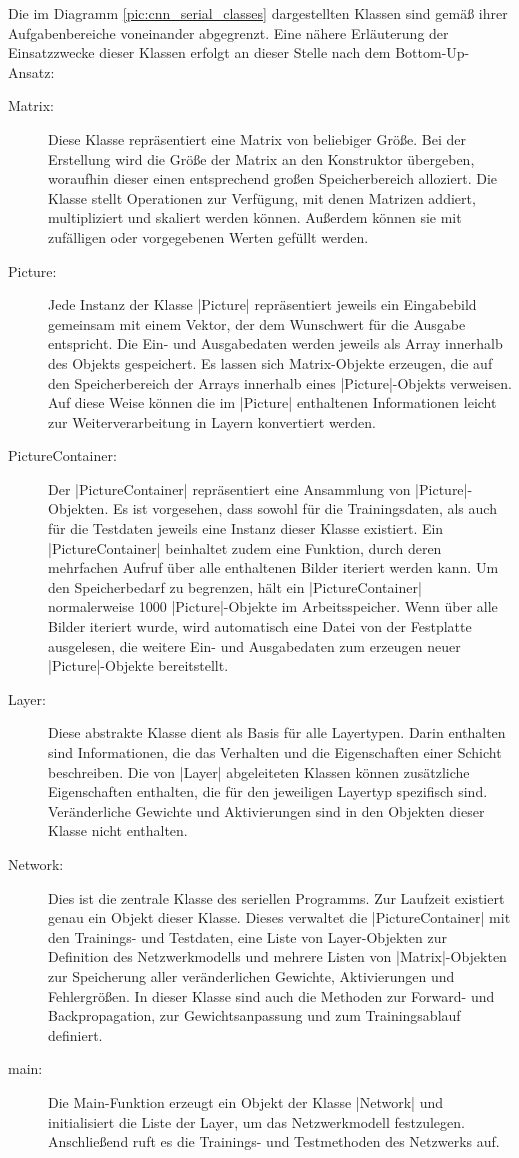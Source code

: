 \documentclass[../main.tex]{subfiles}
\begin{document}
Die im Diagramm \ref{pic:cnn_serial_classes} dargestellten Klassen sind gemäß ihrer Aufgabenbereiche voneinander abgegrenzt. Eine nähere Erläuterung der Einsatzzwecke dieser Klassen erfolgt an dieser Stelle nach dem Bottom-Up-Ansatz: 
\begin{description}
\item[Matrix:] Diese Klasse repräsentiert eine Matrix von beliebiger Größe. Bei der Erstellung wird die Größe der Matrix an den Konstruktor übergeben, woraufhin dieser einen entsprechend großen Speicherbereich alloziert. Die Klasse stellt Operationen zur Verfügung, mit denen Matrizen addiert, multipliziert und skaliert werden können. Außerdem können sie mit zufälligen oder vorgegebenen Werten gefüllt werden. 
\item[Picture:] Jede Instanz der Klasse |Picture| repräsentiert jeweils ein Eingabebild gemeinsam mit einem Vektor, der dem Wunschwert für die Ausgabe entspricht. Die Ein- und Ausgabedaten werden jeweils als Array innerhalb des Objekts gespeichert. Es lassen sich Matrix-Objekte erzeugen, die auf den Speicherbereich der Arrays innerhalb eines |Picture|-Objekts verweisen. Auf diese Weise können die im |Picture| enthaltenen Informationen leicht zur Weiterverarbeitung in Layern konvertiert werden. 
\item[PictureContainer:] Der |PictureContainer| repräsentiert eine Ansammlung von |Picture|-Objekten. Es ist vorgesehen, dass sowohl für die Trainingsdaten, als auch für die Testdaten jeweils eine Instanz dieser Klasse existiert. Ein |PictureContainer| beinhaltet zudem eine Funktion, durch deren mehrfachen Aufruf über alle enthaltenen Bilder iteriert werden kann. Um den Speicherbedarf zu begrenzen, hält ein |PictureContainer| normalerweise 1000 |Picture|-Objekte im Arbeitsspeicher. Wenn über alle Bilder iteriert wurde, wird automatisch eine Datei von der Festplatte ausgelesen, die weitere Ein- und Ausgabedaten zum erzeugen neuer |Picture|-Objekte  bereitstellt. 
\item[Layer:] Diese abstrakte Klasse dient als Basis für alle Layertypen. Darin enthalten sind Informationen, die das Verhalten und die Eigenschaften einer Schicht beschreiben. Die von |Layer| abgeleiteten Klassen können zusätzliche Eigenschaften enthalten, die für den jeweiligen Layertyp spezifisch sind. Veränderliche Gewichte und Aktivierungen sind in den Objekten dieser Klasse nicht enthalten. 
\item[Network:] Dies ist die zentrale Klasse des seriellen Programms. Zur Laufzeit existiert genau ein Objekt dieser Klasse. Dieses verwaltet die |PictureContainer| mit den Trainings- und Testdaten, eine Liste von Layer-Objekten zur Definition des Netzwerkmodells und mehrere Listen von |Matrix|-Objekten zur Speicherung aller veränderlichen Gewichte, Aktivierungen und Fehlergrößen. In dieser Klasse sind auch die Methoden zur Forward- und Backpropagation, zur Gewichtsanpassung und zum Trainingsablauf definiert. 
\item[main:] Die Main-Funktion erzeugt ein Objekt der Klasse |Network| und initialisiert die Liste der Layer, um das Netzwerkmodell festzulegen. Anschließend ruft es die Trainings- und Testmethoden des Netzwerks auf. 
\end{description}
\end{document}
